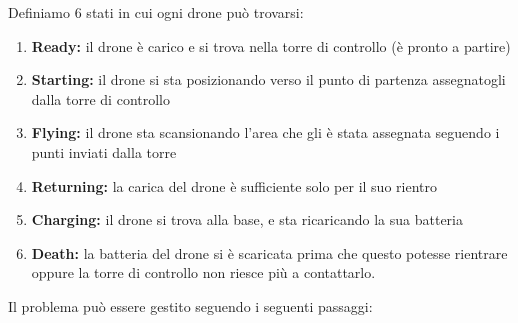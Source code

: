 \documentclass[a4paper, 12pt]{report}
\begin{document}
Definiamo $6$ stati in cui ogni drone può trovarsi:
\begin{enumerate}
    \item \textbf{Ready:} il drone è carico e si trova nella torre di controllo (è pronto a partire)
    \item \textbf{Starting:} il drone si sta posizionando verso il punto di partenza assegnatogli dalla torre di controllo
    \item \textbf{Flying:} il drone sta scansionando l'area che gli è stata assegnata seguendo i punti inviati dalla torre
    \item \textbf{Returning:} la carica del drone è sufficiente solo per il suo rientro 
    \item \textbf{Charging:} il drone si trova alla base, e sta ricaricando la sua batteria
    \item \textbf{Death:} la batteria del drone si è scaricata prima che questo potesse rientrare oppure la torre di controllo non riesce più a contattarlo.
\end{enumerate}
Il problema può essere gestito seguendo i seguenti passaggi:
\end{document}
